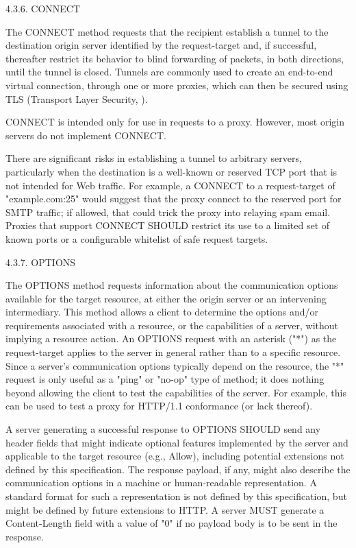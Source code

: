       
    
    4.3.6.  CONNECT
    
       The CONNECT method requests that the recipient establish a tunnel to
       the destination origin server identified by the request-target and,
       if successful, thereafter restrict its behavior to blind forwarding
       of packets, in both directions, until the tunnel is closed.  Tunnels
       are commonly used to create an end-to-end virtual connection, through
       one or more proxies, which can then be secured using TLS (Transport
       Layer Security, ).
    
       CONNECT is intended only for use in requests to a proxy.  
         However, most origin servers do not implement CONNECT.
     
    
       There are significant risks in establishing a tunnel to arbitrary
       servers, particularly when the destination is a well-known or
       reserved TCP port that is not intended for Web traffic.  For example,
       a CONNECT to a request-target of "example.com:25" would suggest that
       the proxy connect to the reserved port for SMTP traffic; if allowed,
       that could trick the proxy into relaying spam email.  Proxies that
       support CONNECT SHOULD restrict its use to a limited set of known
       ports or a configurable whitelist of safe request targets.
    
    
    4.3.7.  OPTIONS
    
       The OPTIONS method requests information about the communication
       options available for the target resource, at either the origin
       server or an intervening intermediary.  This method allows a client
       to determine the options and/or requirements associated with a
       resource, or the capabilities of a server, without implying a
       resource action.
       An OPTIONS request with an asterisk ("*") as the request-target
    applies to the server in general rather
   than to a specific resource.  Since a server's communication options
   typically depend on the resource, the "*" request is only useful as a
   "ping" or "no-op" type of method; it does nothing beyond allowing the
   client to test the capabilities of the server.  For example, this can
   be used to test a proxy for HTTP/1.1 conformance (or lack thereof).

  
   A server generating a successful response to OPTIONS SHOULD send any
   header fields that might indicate optional features implemented by
   the server and applicable to the target resource (e.g., Allow),
   including potential extensions not defined by this specification.
   The response payload, if any, might also describe the communication
   options in a machine or human-readable representation.  A standard
   format for such a representation is not defined by this
   specification, but might be defined by future extensions to HTTP.  A
   server MUST generate a Content-Length field with a value of "0" if no
   payload body is to be sent in the response.

